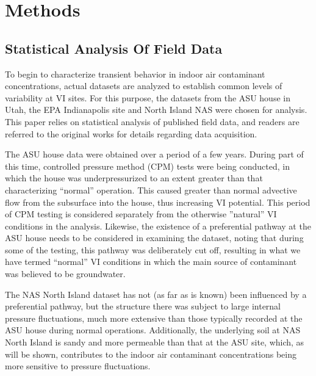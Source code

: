 \documentclass[journal=esthag,manuscript=article]{achemso}
\begin{document}
\section{Methods}


\subsection{Statistical Analysis Of Field Data}

To begin to characterize transient behavior in indoor air contaminant concentrations, actual datasets are analyzed to establish common levels of variability at VI sites.
For this purpose, the datasets from the ASU house in Utah, the EPA Indianapolis site and North Island NAS were chosen for analysis.
This paper relies on statistical analysis of published field data, and readers are referred to the original works for details regarding data acquisition\cite{holton_evaluation_2015,guo_vapor_2015,holton_temporal_2013,hosangadi_high-frequency_2017,u.s._environmental_protection_agency_assessment_2015}. \par

The ASU house data were obtained over a period of a few years.
During part of this time, controlled pressure method (CPM) tests were being conducted, in which the house was underpressurized to an extent greater than that characterizing “normal” operation.
This caused greater than normal advective flow from the subsurface into the house, thus increasing VI potential\cite{mchugh_evaluation_2012,mchugh_recent_2017,holton_evaluation_2015}.
This period of CPM testing is considered separately from the otherwise ”natural” VI conditions in the analysis.
Likewise, the existence of a preferential pathway at the ASU house needs to be considered in examining the dataset, noting that during some of the testing, this pathway was deliberately cut off, resulting in what we have termed “normal” VI conditions in which the main source of contaminant was believed to be groundwater. \par

The NAS North Island dataset has not (as far as is known) been influenced by a preferential pathway, but the structure there was subject to large internal pressure fluctuations, much more extensive than those typically recorded at the ASU house during normal operations.
Additionally, the underlying soil at NAS North Island is sandy and more permeable than that at the ASU site, which, as will be shown, contributes to the indoor air contaminant concentrations being more sensitive to pressure fluctuations\cite{hosangadi_high-frequency_2017}. \par
\end{document}
